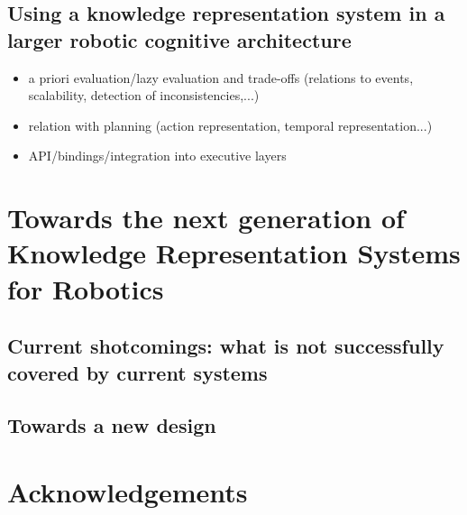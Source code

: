 \documentclass[a4paper, twocolumn]{article}
\begin{document}
\subsection{Using a knowledge representation system in a larger robotic cognitive architecture}
\label{sect|summary-integration}

\begin{itemize}
	\item a priori evaluation/lazy evaluation and trade-offs (relations to events, scalability, detection of inconsistencies,...)
	\item relation with planning (action representation, temporal representation...)
	\item API/bindings/integration into executive layers
\end{itemize}

\section{Towards the next generation of Knowledge Representation Systems for Robotics}
\label{sect|conclusion}

\subsection{Current shotcomings: what is not successfully covered by current systems}

\subsection{Towards a new design}

\section*{Acknowledgements} 




\end{document}
